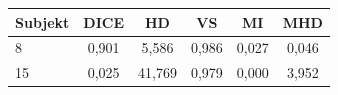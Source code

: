 \begin{tabular}{l c c c c c}
 \hline
Subjekt & DICE & HD & VS & MI & MHD \\ \hline
8 & 0,901 & 5,586 & 0,986 & 0,027 & 0,046 \\
15 & 0,025 & 41,769 & 0,979 & 0,000 & 3,952 \\
\hline 
 \end{tabular}
